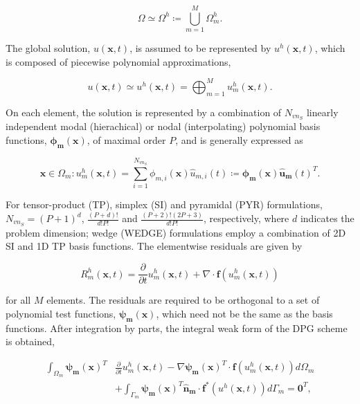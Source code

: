\documentclass[12pt,Bold,letterpaper,TexShade]{mcgilletdclass}
\numberwithin{equation}{section}
\newcommand{\vect}[1]{\bm{{#1}}}
\begin{document}
\begin{equation*}
\Omega \simeq \Omega^h \coloneqq \bigcup_{m = 1}^{M} \Omega^h_m.
\end{equation*}

The global solution, $u(\vect{x},t)$, is assumed to be represented by $u^h(\vect{x},t)$, which is composed of piecewise polynomial approximations, 

\begin{equation} \nonumber
u(\vect{x},t) \simeq u^h(\vect{x},t) = \bigoplus_{m = 1}^M u^h_m(\vect{x},t).
\end{equation}

On each element, the solution is represented by a combination of $N_{vn_S}$ linearly independent modal (hierachical) or nodal (interpolating) polynomial basis functions, $\vect{\phi_{m}}(\vect{x})$, of maximal order $P$, and is generally expressed as

\begin{equation} \nonumber
\vect{x} \in \Omega_m: u^h_{m}(\vect{x},t)
=
\sum_{i=1}^{N_{vn_S}} \phi_{m,i}(\vect{x}) \hat{u}_{m,i}(t)
\coloneqq
\vect{\phi_m}(\vect{x}) \vect{\hat{u}_m}(t)^T.
\end{equation}

For tensor-product (TP), simplex (SI) and pyramidal (PYR) formulations, $N_{vn_S} = (P+1)^d$, $\frac{(P+d)!}{d!P!}$ and $\frac{(P+2)!(2P+3)}{d!P!}$, respectively, where $d$ indicates the problem dimension; wedge (WEDGE) formulations employ a combination of 2D SI and 1D TP basis functions. The elementwise residuals are given by

\begin{equation} \label{eq:residual_m}
R_m^h(\vect{x},t) 
= \frac{\partial}{\partial t} u_m^h(\vect{x},t) + \nabla \cdot \vect{f}(u_m^h(\vect{x},t))
\end{equation}

for all $M$ elements. The residuals are required to be orthogonal to a set of polynomial test functions, $\vect{\psi_{m}}(\vect{x})$, which need not be the same as the basis functions. After integration by parts, the integral weak form of the DPG scheme is obtained,

\begin{align*}
\int_{\Omega_m} \vect{\psi_m}(\vect{x})^T & \frac{\partial}{\partial t} u_m^h(\vect{x},t) -
\nabla \vect{\psi_m}(\vect{x})^T \cdot \boldsymbol f(u_m^h(\vect{x},t)) d \Omega_m \\
& + \int_{\Gamma_m} \vect{\psi_m}(\vect{x})^T \vect{\hat{n}_m} \cdot \vect{f^*}(u^h(\vect{x},t)) d \Gamma_m = \vect{0}^T, 
\end{align*}
\end{document}
